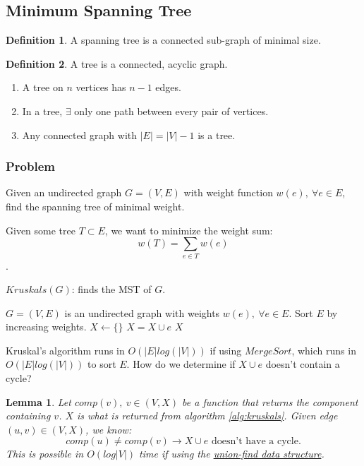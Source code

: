 \documentclass{article}
\newtheorem{lemma}[theorem]{Lemma}
\theoremstyle{definition}
\newtheorem{definition}{Definition}[section]
\begin{document}
\subsection{Minimum Spanning Tree}
\begin{definition}
A spanning tree is a connected sub-graph of minimal size.
\end{definition}
\begin{definition}
A tree is a connected, acyclic graph.

\begin{enumerate}
\item A tree on $n$ vertices has $n-1$ edges.
\item In a tree, $\exists$ only one path between every pair of vertices.
\item Any connected graph with $|E|=|V|-1$ is a tree.
\end{enumerate}
\end{definition}

\subsubsection{Problem}
Given an undirected graph $G = (V,E)$ with weight function $w(e),\: \forall e \in E$, find the spanning tree of minimal weight. 

Given some tree $T \subset E$, we want to minimize the weight sum: $$w(T) = \sum_{e \in T}w(e)$$.

\begin{algorithm}
	\caption{$Kruskals(G)$: finds the MST of $G$.}
	\label{alg:kruskals}
	\begin{algorithmic}[1]
		\REQUIRE $G=(V,E)$ is an undirected graph with weights $w(e), \: \forall e \in E$.
		\STATE Sort $E$ by increasing weights. 
		\STATE $X \gets \{\}$
			\STATE $X = X \cup e$
		\ENDIF
		\ENDFOR
		\RETURN $X$
	\end{algorithmic}
\end{algorithm}

Kruskal's algorithm runs in $O(|E|log(|V|))$ if using $MergeSort$, which runs in $O(|E|log(|V|))$ to sort $E$. How do we determine if $X \cup e$ doesn't contain a cycle? 

\begin{lemma}
	Let $comp(v), \: v \in (V,X)$ be a function that returns the component containing $v$. $X$ is what is returned from algorithm \ref{alg:kruskals}. Given edge $(u,v) \in (V,X)$, we know:
	$$comp(u) \neq comp(v) \to X \cup e \text{ doesn't have a cycle.}$$
	This is possible in $O(log|V|)$ time if using the \href{https://en.wikipedia.org/wiki/Disjoint-set_data_structure}{union-find data structure}.
\end{lemma}
\end{document}
